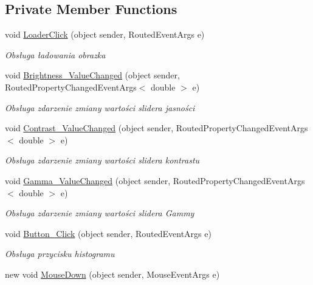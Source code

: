 \subsection*{Private Member Functions}
\begin{DoxyCompactItemize}
\item 
void \mbox{\hyperlink{class_grafika_proj_1_1_main_window_a987805e1fd3b72da6a64a0134944a2bd}{Loader\+Click}} (object sender, Routed\+Event\+Args e)
\begin{DoxyCompactList}\small\item\em Obsługa ładowania obrazka \end{DoxyCompactList}\item 
void \mbox{\hyperlink{class_grafika_proj_1_1_main_window_a7d75ee46d529a9c3f8cba914bc6ce0c1}{Brightness\+\_\+\+Value\+Changed}} (object sender, Routed\+Property\+Changed\+Event\+Args$<$ double $>$ e)
\begin{DoxyCompactList}\small\item\em Obsługa zdarzenie zmiany wartości slider\textquotesingle{}a jasności \end{DoxyCompactList}\item 
void \mbox{\hyperlink{class_grafika_proj_1_1_main_window_a994f218057b535a3f002eb42fca0ecd0}{Contrast\+\_\+\+Value\+Changed}} (object sender, Routed\+Property\+Changed\+Event\+Args$<$ double $>$ e)
\begin{DoxyCompactList}\small\item\em Obsługa zdarzenie zmiany wartości slider\textquotesingle{}a kontrastu \end{DoxyCompactList}\item 
void \mbox{\hyperlink{class_grafika_proj_1_1_main_window_a3e949c359663048bc3d28baab78111f0}{Gamma\+\_\+\+Value\+Changed}} (object sender, Routed\+Property\+Changed\+Event\+Args$<$ double $>$ e)
\begin{DoxyCompactList}\small\item\em Obsługa zdarzenie zmiany wartości slider\textquotesingle{}a Gammy \end{DoxyCompactList}\item 
void \mbox{\hyperlink{class_grafika_proj_1_1_main_window_a787e0f1c91e2c159b35271e5ff3b4ec6}{Button\+\_\+\+Click}} (object sender, Routed\+Event\+Args e)
\begin{DoxyCompactList}\small\item\em Obsługa przycisku histogramu \end{DoxyCompactList}\item 
new void \mbox{\hyperlink{class_grafika_proj_1_1_main_window_af8f425f347eac5ffc828e032eef48496}{Mouse\+Down}} (object sender, Mouse\+Event\+Args e)

\end{DoxyCompactItemize}
